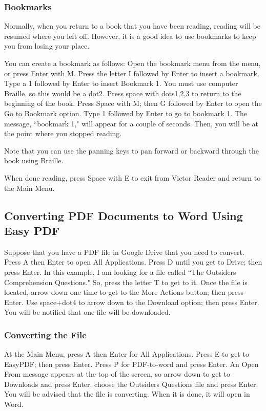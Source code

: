 \documentclass[10pt,letterpaper,twoside]{report}
\begin{document}
{{{\subsubsection{Bookmarks}

Normally, when you return to a book that you have been reading, reading will be resumed where you left off. However, it is a good idea to use bookmarks to keep you from losing your place.

You can create a bookmark as follows:
Open the bookmark menu from the menu, or press Enter with M.
Press the letter I followed by Enter to insert a bookmark.
Type a 1 followed by Enter to insert Bookmark 1. You must use computer Braille, so this would be a dot2.
Press space with dots1,2,3 to return to the beginning of the book.
Press Space with M; then G followed by Enter to open the Go to Bookmark option.
Type 1 followed by Enter to go to bookmark 1. The message, ``bookmark 1,"
will appear for a couple of seconds. Then, you will be at the point where you stopped reading.

Note that you can use the panning keys to pan forward or backward through the book using Braille.

When done reading, press Space with E to exit from Victor Reader and return to the Main Menu.

\subsection{Converting PDF Documents to Word Using Easy PDF}

Suppose that you have a PDF file in Google Drive that you need to convert.
Press A then Enter to open All Applications.
Press D until you get to Drive; then press Enter.
In this example, I am looking for a file called ``The Outsiders Comprehension Questions." So, press the letter T to get to it.
Once the file is located, arrow down one time to get to the More Actions button; then press Enter.
Use space+dot4 to arrow down to the Download option; then press Enter. You will be notified that one file will be downloaded.

\subsubsection{Converting the File}

At the Main Menu, press A then Enter for All Applications.
Press E to get to EasyPDF; then press Enter.
Press P for PDF-to-word and press Enter.
An Open From message appears at the top of the screen, so arrow down to get to Downloads and press Enter.
choose the Outsiders Questions file and press Enter. You will be advised that the file is converting. When it is done, it will open in Word.

}}}
\end{document}
